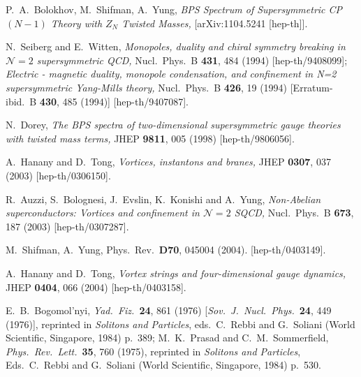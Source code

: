 \documentclass[epsfig,12pt]{article}
\begin{document}
\begin{thebibliography}{99}

  P.~A.~Bolokhov, M.~Shifman, A.~Yung,
{\em BPS Spectrum of Supersymmetric {\rm CP}$(N-1)$ Theory with $Z_N$ Twisted Masses,}
    [arXiv:1104.5241 [hep-th]].
    
  N.~Seiberg and E.~Witten,
{\em Monopoles, duality and chiral symmetry breaking in ${\mathcal N}=2$ supersymmetric QCD,}
  Nucl.\ Phys.\ B {\bf 431}, 484 (1994)
  [hep-th/9408099];
{\em Electric - magnetic duality, monopole condensation, and confinement in N=2 supersymmetric Yang-Mills theory,}
  Nucl.\ Phys.\ B {\bf 426}, 19 (1994)
  [Erratum-ibid.\ B {\bf 430}, 485 (1994)]
  [hep-th/9407087].

  N.~Dorey,
{\em The BPS spectra of two-dimensional supersymmetric gauge theories with twisted mass terms,}
  JHEP {\bf 9811}, 005 (1998)
  [hep-th/9806056].

   A.~Hanany and D.~Tong,
  {\em Vortices, instantons and branes,}
  JHEP {\bf 0307}, 037 (2003)
  [hep-th/0306150].
  
   R.~Auzzi, S.~Bolognesi, J.~Evslin, K.~Konishi and A.~Yung,
{\em Non-Abelian superconductors: Vortices and confinement in ${\mathcal N}=2$ SQCD,}
  Nucl.\ Phys.\ B {\bf 673}, 187 (2003)
  [hep-th/0307287].

  M.~Shifman, A.~Yung,
  Phys.\ Rev.\  {\bf D70}, 045004 (2004).
  [hep-th/0403149].

      A.~Hanany and D.~Tong,
{\em Vortex strings and four-dimensional gauge dynamics,}
  JHEP {\bf 0404}, 066 (2004)
  [hep-th/0403158].
  

      E.~B.~Bogomol'nyi,
{\em Yad.\ Fiz.}\ {\bf 24}, 861  (1976)
[{\em Sov.\ J.\ Nucl.\ Phys.}\  {\bf 24}, 449 (1976)],
reprinted in  {\em  Solitons and
Particles}, eds.\ C.~Rebbi and G.~Soliani 
(World Scientific, Singapore, 1984)
p.~389;
M.~K.~Prasad and C.~M.~Sommerfield,
{\em Phys.\ Rev.\ Lett.}\  {\bf 35}, 760 (1975),
reprinted in  {\em  Solitons and
Particles}, Eds.\ C.~Rebbi and G.~Soliani (World Scientific, Singapore, 1984) 
p.~530.


\end{thebibliography}
\end{document}
